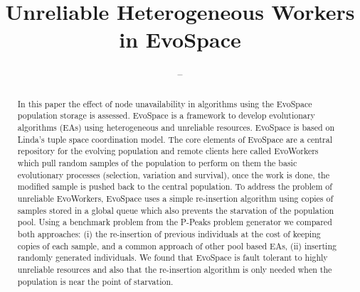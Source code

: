 \documentclass{llncs}
\begin{document}
\title{ Unreliable Heterogeneous Workers in EvoSpace }
%
%
\author{--}

\maketitle              %

\begin{abstract}
	In this paper the effect of node unavailability in algorithms using the 
	EvoSpace population storage is assessed. EvoSpace is
	a framework to develop evolutionary algorithms (EAs) using 
	heterogeneous and unreliable resources. EvoSpace is based on Linda's tuple
	space coordination model. The core elements of EvoSpace are a central 
	repository for the evolving population and remote clients here called EvoWorkers
	which pull random samples of the population to perform on them the basic evolutionary
	processes (selection, variation and survival), once the work is done, the
	modified sample is pushed back to the central population. To address the problem 
	of unreliable EvoWorkers, EvoSpace uses a simple re-insertion algorithm using copies of
	samples stored in a global queue which also prevents the starvation of the population pool.
	Using a benchmark problem from the P-Peaks problem generator we compared both approaches: 
	(i) the re-insertion of previous individuals at the cost of keeping copies of each sample, 
	and a common approach of other pool based EAs, (ii) inserting  randomly generated
	individuals. We found that EvoSpace is fault tolerant to highly unreliable resources and
	also that the re-insertion algorithm is only needed when the population is near the point of starvation.
\end{abstract}
%
\end{document}
